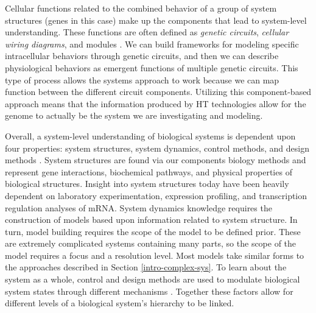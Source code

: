 Cellular functions related to the combined behavior of a group of system structures (genes in this case) make up the components that lead to system-level understanding. These functions are often defined as \textit{genetic circuits}, \textit{cellular wiring diagrams}, and modules \citep{Palsson2006}. We can build frameworks for modeling specific intracellular behaviors through genetic circuits, and then we can describe physiological behaviors as emergent functions of multiple genetic circuits. This type of process allows the systems approach to work because we can map function between the different circuit components. Utilizing this component-based approach means that the information produced by \acrshort{HT} technologies allow for the genome to actually be the system we are investigating and modeling.

Overall, a system-level understanding of biological systems is dependent upon four properties: system structures, system dynamics, control methods, and design methods \citep{Kitano2002}. System structures are found via our components biology methods and represent gene interactions, biochemical pathways, and physical properties of biological structures. Insight into system structures today have been heavily dependent on laboratory experimentation, expression profiling, and transcription regulation analyses of \acrfull{mRNA}. System dynamics knowledge requires the construction of models based upon information related to system structure. In turn, model building requires the scope of the model to be defined prior. These are extremely complicated systems containing many parts, so the scope of the model requires a focus and a resolution level. Most models take similar forms to the approaches described in Section \ref{intro-complex-sys}. To learn about the system as a whole, control and design methods are used to modulate biological system states through different mechanisms \citep{Kitano2002}. Together these factors allow for different levels of a biological system's hierarchy to be linked. 


